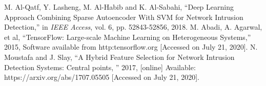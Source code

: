 \documentclass[conference]{IEEEtran}
\begin{document}
\begin{thebibliography}{00}
 M. Al-Qatf, Y. Lasheng, M. Al-Habib and K. Al-Sabahi, ``Deep Learning Approach Combining Sparse Autoencoder With SVM for Network Intrusion Detection,'' in \textit{IEEE Access}, vol. 6, pp. 52843-52856, 2018.
 M. Abadi, A. Agarwal, et al, ``TensorFlow: Large-scale Machine Learning on Heterogeneous Systems,'' 2015, Software available from http:tensorflow.org [Accessed on July 21, 2020].
 N. Moustafa and J. Slay, ``A Hybrid Feature Selection for Network Intrusion Detection Systems: Central points, '' 2017, [online] Available: https://arxiv.org/abs/1707.05505 [Accessed on July 21, 2020].

\iffalse
\bibitem{}
\bibitem{}
\bibitem{}
\fi
\end{thebibliography}
\end{document}
